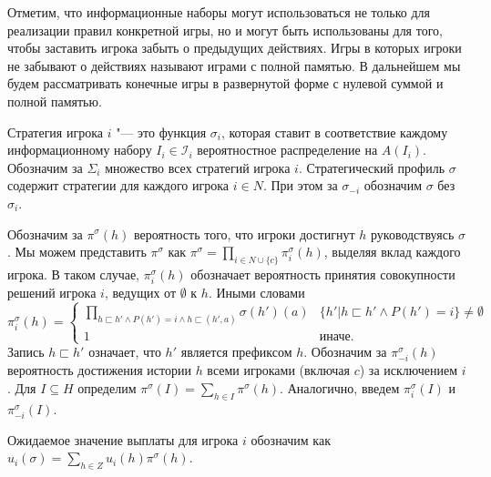 \par
 Отметим, что информационные наборы могут использоваться не только для реализации правил конкретной игры, но и могут быть использованы для того, чтобы заставить игрока забыть о предыдущих действиях. Игры в которых игроки не забывают о действиях называют играми с полной памятью. В дальнейшем мы будем рассматривать конечные игры в развернутой форме с нулевой суммой и полной памятью.

Стратегия игрока $i$ "--- это функция $\sigma_i$, которая ставит в соответствие каждому информационному набору $I_i \in \mathcal{I}_i$ вероятностное распределение на $A(I_i)$. Обозначим за $\Sigma_i$ множество всех стратегий игрока $i$. Стратегический профиль $\sigma$ содержит стратегии для каждого игрока $i \in N$. При этом за $\sigma_{-i}$ обозначим $\sigma$ без $\sigma_i$. 

Обозначим за $\pi^\sigma(h)$ вероятность того, что игроки достигнут $h$ руководствуясь $\sigma$. Мы можем представить $\pi^\sigma$ как $\pi^\sigma = \prod_{i\in N\cup\{c\}}\pi_i^\sigma(h)$, выделяя вклад каждого игрока. В таком случае, $\pi_i^\sigma(h)$ обозначает вероятность принятия совокупности решений игрока $i$, ведущих от $\emptyset$ к $h$. Иными словами
\begin{equation*} 
\pi_i^\sigma(h)=
\begin{cases}
	\prod_{h \sqsubset h' \wedge P(h')=i \wedge h \sqsubset (h',a)} \sigma(h')(a) & \{h' | h \sqsubset h' \wedge P(h')=i \} \neq \emptyset\\
	1 &\text{иначе.}
\end{cases}
\end{equation*}
Запись $h \sqsubset h'$ означает, что $h'$ является префиксом $h$. 
Обозначим за $\pi_{-i}^\sigma(h) $ вероятность достижения истории $h$ всеми игроками (включая $c$) за исключением $i$.
Для $I \subseteq H $ определим $\pi^\sigma(I) = \sum_{h\in I}\pi^\sigma(h)$. Аналогично, введем $\pi_i^\sigma(I)$ и $\pi_{-i}^\sigma(I)$. 
\par
Ожидаемое значение выплаты для игрока $i$ обозначим как $u_i(\sigma)=\sum_{h\in Z}u_i(h)\pi^\sigma(h)$. 

